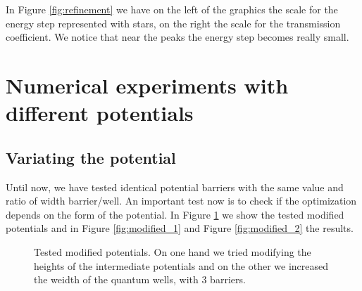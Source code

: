 \documentclass[12pt,a4paper,onecolumn]{article}
\theoremstyle{definition}
\theoremstyle{plain}
\begin{document}
In Figure \ref {fig:refinement} we have on the left of the graphics the scale for the energy step represented with stars, on the right the scale for the transmission coefficient. We notice that near the peaks the energy step becomes really small.










\section{Numerical experiments with different potentials}
\subsection{Variating the potential}
Until now, we have tested identical potential barriers with the same value and ratio of width barrier/well. An important test now is to check if the optimization depends on the form of the potential. In Figure \ref {fig:modified_potentials} we show the tested modified potentials and in Figure \ref{fig:modified_1} and Figure \ref{fig:modified_2} the results.

\begin{figure}[H]
\centering
	\caption{Tested modified potentials. On one hand we tried modifying the heights of the intermediate potentials and on the other we increased the weidth of the quantum wells, with 3 barriers.} 
	\label{fig:modified_potentials}
\end{figure}
\end{document}
